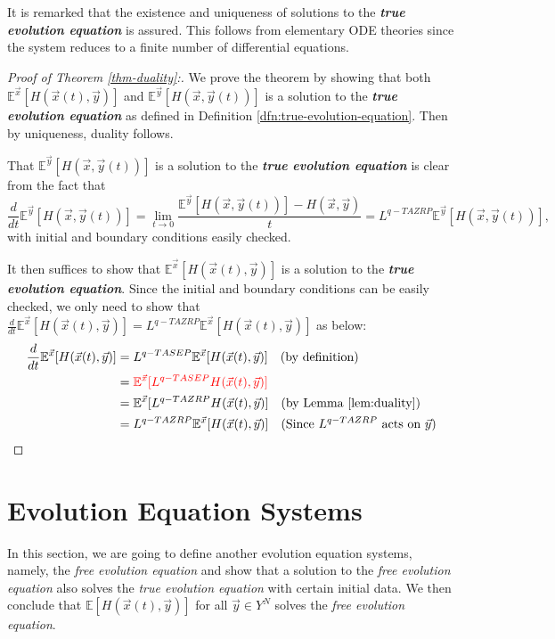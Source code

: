 \begin{remark}
It is remarked that the existence and uniqueness of solutions to the \textbf{\emph{true evolution equation}} is assured. This follows from elementary ODE theories since the system reduces to a finite number of differential equations. 
\end{remark}

\begin{proof}[Proof of Theorem \ref{thm-duality}:]
We prove the theorem by showing that both $\mathbb{E}^{\vec{x}}[H(\vec{x}(t),\vec{y})]$ and $\mathbb{E}^{\vec{y}}[H(\vec{x},\vec{y}(t))]$ is a solution to the \textbf{\emph{true evolution equation}} as defined in Definition \ref{dfn:true-evolution-equation}. Then by uniqueness, duality follows. 

That $\mathbb{E}^{\vec{y}}[H(\vec{x},\vec{y}(t))]$ is a solution to the \textbf{\emph{true evolution equation}} is clear from the fact that $$\frac{d}{dt}\mathbb{E}^{\vec{y}}[H(\vec{x},\vec{y}(t))] = \lim_{t \rightarrow 0} \frac{\mathbb{E}^{\vec{y}}[H(\vec{x},\vec{y}(t))] - H(\vec{x},\vec{y})}{t} = L^{q-TAZRP} \mathbb{E}^{\vec{y}}[H(\vec{x},\vec{y}(t))],$$ with initial and boundary conditions easily checked. 

It then suffices to show that $\mathbb{E}^{\vec{x}}[H(\vec{x}(t),\vec{y})]$ is a solution to the \textbf{\emph{true evolution equation}}. Since the initial and boundary conditions can be easily checked, we only need to show that $\frac{d}{dt} \mathbb{E}^{\vec{x}}[H(\vec{x}(t),\vec{y})] = L^{q-TAZRP} \mathbb{E}^{\vec{x}}[H(\vec{x}(t),\vec{y})]$ as below:
\begin{align*}
\frac{d}{dt} \mathbb{E}^{\vec{x}}[H(\vec{x}(t),\vec{y})] &= L^{q-TASEP} \mathbb{E}^{\vec{x}}[H(\vec{x}(t),\vec{y})] \quad (\text{by definition})\\
																												 &= \textcolor{red}{\mathbb{E}^{\vec{x}} [L^{q-TASEP} H(\vec{x}(t),\vec{y})]}\\
																												 &= \mathbb{E}^{\vec{x}} [L^{q-TAZRP} H(\vec{x}(t),\vec{y})] \quad (\text{by Lemma }\ref{lem:duality}) \\
																												 &= L^{q-TAZRP} \mathbb{E}^{\vec{x}} [H(\vec{x}(t),\vec{y})] \quad (\text{Since $L^{q-TAZRP}$ acts on $\vec{y}$})
\end{align*}
\end{proof}
\section{Evolution Equation Systems}
In this section, we are going to define another evolution equation systems, namely, the \emph{free evolution equation} and show that a solution to the \emph{free evolution equation} also solves the \emph{true evolution equation} with certain initial data. We then conclude that $\mathbb{E}[H(\vec{x}(t),\vec{y})]$ for all $\vec{y} \in Y^N$ solves the \emph{free evolution equation}.

